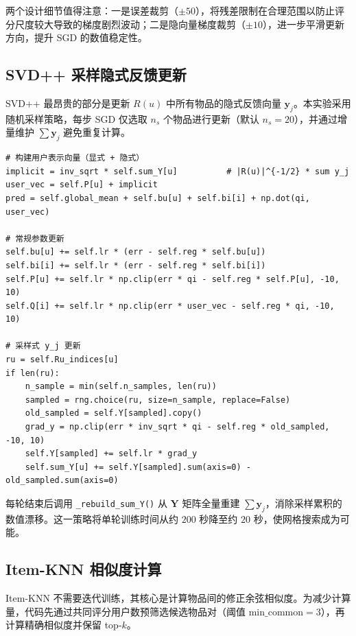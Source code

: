 \documentclass[UTF8,a4paper,10pt]{ctexart}
\begin{document}
两个设计细节值得注意：一是误差裁剪（$\pm 50$），将残差限制在合理范围以防止评分尺度较大导致的梯度剧烈波动；二是隐向量梯度裁剪（$\pm 10$），进一步平滑更新方向，提升 SGD 的数值稳定性。

\subsection{SVD++ 采样隐式反馈更新}

SVD++ 最昂贵的部分是更新 $R(u)$ 中所有物品的隐式反馈向量 $\mathbf{y}_j$。本实验采用随机采样策略，每步 SGD 仅选取 $n_s$ 个物品进行更新（默认 $n_s=20$），并通过增量维护 $\sum \mathbf{y}_j$ 避免重复计算。

\begin{lstlisting}[caption={SVD++ 采样式 $\mathbf{y}_j$ 更新（\texttt{svdpp.py}）}, label={lst:svdpp}]
# 构建用户表示向量（显式 + 隐式）
implicit = inv_sqrt * self.sum_Y[u]          # |R(u)|^{-1/2} * sum y_j
user_vec = self.P[u] + implicit
pred = self.global_mean + self.bu[u] + self.bi[i] + np.dot(qi, user_vec)

# 常规参数更新
self.bu[u] += self.lr * (err - self.reg * self.bu[u])
self.bi[i] += self.lr * (err - self.reg * self.bi[i])
self.P[u] += self.lr * np.clip(err * qi - self.reg * self.P[u], -10, 10)
self.Q[i] += self.lr * np.clip(err * user_vec - self.reg * qi, -10, 10)

# 采样式 y_j 更新
ru = self.Ru_indices[u]
if len(ru):
    n_sample = min(self.n_samples, len(ru))
    sampled = rng.choice(ru, size=n_sample, replace=False)
    old_sampled = self.Y[sampled].copy()
    grad_y = np.clip(err * inv_sqrt * qi - self.reg * old_sampled, -10, 10)
    self.Y[sampled] += self.lr * grad_y
    self.sum_Y[u] += self.Y[sampled].sum(axis=0) - old_sampled.sum(axis=0)
\end{lstlisting}

每轮结束后调用 \texttt{\_rebuild\_sum\_Y()} 从 $\mathbf{Y}$ 矩阵全量重建 $\sum\mathbf{y}_j$，消除采样累积的数值漂移。这一策略将单轮训练时间从约 $200$ 秒降至约 $20$ 秒，使网格搜索成为可能。

\subsection{Item-KNN 相似度计算}

Item-KNN 不需要迭代训练，其核心是计算物品间的修正余弦相似度。为减少计算量，代码先通过共同评分用户数预筛选候选物品对（阈值 $\text{min\_common}=3$），再计算精确相似度并保留 top-$k$。
\end{document}
